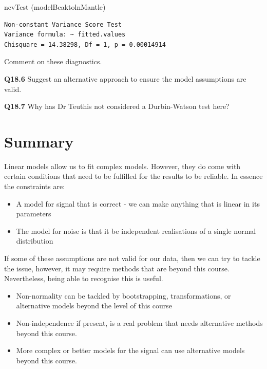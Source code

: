 \documentclass[
  oneside]{krantz}
\newenvironment{Shaded}{\begin{snugshade}}{\end{snugshade}}
\newcommand{\FunctionTok}[1]{\textcolor[rgb]{0.00,0.00,0.00}{#1}}
\newcommand{\NormalTok}[1]{#1}
\providecommand{\tightlist}{%
  \setlength{\itemsep}{0pt}\setlength{\parskip}{0pt}}
\begin{document}
\begin{Shaded}
\begin{Highlighting}[]
\FunctionTok{ncvTest}\NormalTok{ (modelBeaktolnMantle)}
\end{Highlighting}
\end{Shaded}

\begin{verbatim}
Non-constant Variance Score Test 
Variance formula: ~ fitted.values 
Chisquare = 14.38298, Df = 1, p = 0.00014914
\end{verbatim}

Comment on these diagnostics.

\textbf{Q18.6} Suggest an alternative approach to ensure the model assumptions are valid.

\textbf{Q18.7} Why has Dr Teuthis not considered a Durbin-Watson test here?

\hypertarget{SUMdiag}{%
\section{Summary}\label{SUMdiag}}

Linear models allow us to fit complex models. However, they do come with certain conditions that need to be fulfilled for the results to be reliable. In essence the constraints are:

\begin{itemize}
\tightlist
\item
  A model for signal that is correct - we can make anything that is linear in its parameters
\item
  The model for noise is that it be independent realisations of a single normal distribution
\end{itemize}

If some of these assumptions are not valid for our data, then we can try to tackle the issue, however, it may require methods that are beyond this course. Nevertheless, being able to recognise this is useful.

\begin{itemize}
\item
  Non-normality can be tackled by bootstrapping, transformations, or alternative models beyond the level of this course
\item
  Non-independence if present, is a real problem that needs alternative methods beyond this course.
\item
  More complex or better models for the signal can use alternative models beyond this course.
\end{itemize}
\end{document}
